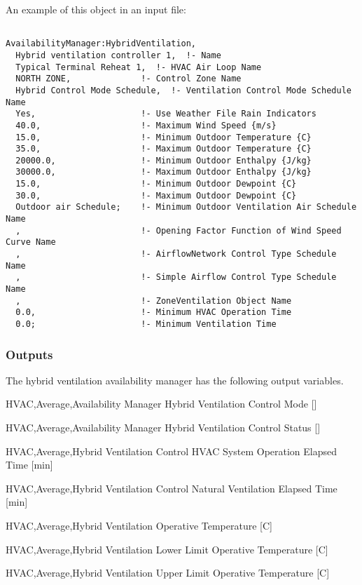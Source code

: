 An example of this object in an input file:

\begin{lstlisting}

AvailabilityManager:HybridVentilation,
  Hybrid ventilation controller 1,  !- Name
  Typical Terminal Reheat 1,  !- HVAC Air Loop Name
  NORTH ZONE,              !- Control Zone Name
  Hybrid Control Mode Schedule,  !- Ventilation Control Mode Schedule Name
  Yes,                     !- Use Weather File Rain Indicators
  40.0,                    !- Maximum Wind Speed {m/s}
  15.0,                    !- Minimum Outdoor Temperature {C}
  35.0,                    !- Maximum Outdoor Temperature {C}
  20000.0,                 !- Minimum Outdoor Enthalpy {J/kg}
  30000.0,                 !- Maximum Outdoor Enthalpy {J/kg}
  15.0,                    !- Minimum Outdoor Dewpoint {C}
  30.0,                    !- Maximum Outdoor Dewpoint {C}
  Outdoor air Schedule;    !- Minimum Outdoor Ventilation Air Schedule Name
  ,                        !- Opening Factor Function of Wind Speed Curve Name
  ,                        !- AirflowNetwork Control Type Schedule Name
  ,                        !- Simple Airflow Control Type Schedule Name
  ,                        !- ZoneVentilation Object Name
  0.0,                     !- Minimum HVAC Operation Time
  0.0;                     !- Minimum Ventilation Time

\end{lstlisting}

\subsubsection{Outputs}\label{outputs-9-008}

The hybrid ventilation availability manager has the following output variables.

HVAC,Average,Availability Manager Hybrid Ventilation Control Mode {[]}

HVAC,Average,Availability Manager Hybrid Ventilation Control Status {[]}

HVAC,Average,Hybrid Ventilation Control HVAC System Operation Elapsed Time {[min]}

HVAC,Average,Hybrid Ventilation Control Natural Ventilation Elapsed Time {[min]}

HVAC,Average,Hybrid Ventilation Operative Temperature {[C]}

HVAC,Average,Hybrid Ventilation Lower Limit Operative Temperature {[C]}

HVAC,Average,Hybrid Ventilation Upper Limit Operative Temperature {[C]}

